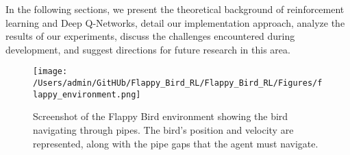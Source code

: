 In the following sections, we present the theoretical background of reinforcement learning and Deep Q-Networks, detail our implementation approach, analyze the results of our experiments, discuss the challenges encountered during development, and suggest directions for future research in this area.

\begin{figure}[!t]
\centering
\texttt{[image: /Users/admin/GitHUb/Flappy\_Bird\_RL/Flappy\_Bird\_RL/Figures/flappy\_environment.png]}
\caption{Screenshot of the Flappy Bird environment showing the bird navigating through pipes. The bird's position and velocity are represented, along with the pipe gaps that the agent must navigate.}
\label{fig:flappy_environment}
\end{figure}